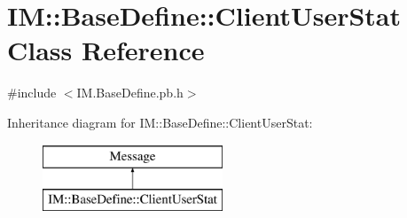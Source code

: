 \hypertarget{class_i_m_1_1_base_define_1_1_client_user_stat}{}\section{I\+M\+:\+:Base\+Define\+:\+:Client\+User\+Stat Class Reference}
\label{class_i_m_1_1_base_define_1_1_client_user_stat}


{\ttfamily \#include $<$I\+M.\+Base\+Define.\+pb.\+h$>$}

Inheritance diagram for I\+M\+:\+:Base\+Define\+:\+:Client\+User\+Stat\+:\begin{figure}[H]
\begin{center}
\leavevmode
\includegraphics[height=2.000000cm]{class_i_m_1_1_base_define_1_1_client_user_stat}
\end{center}
\end{figure}
